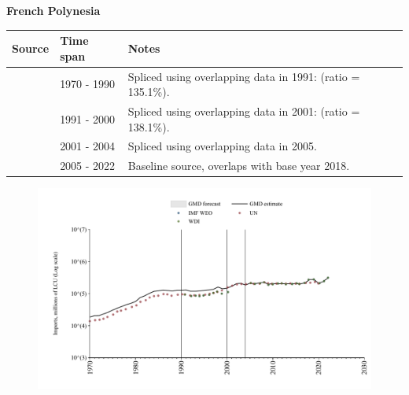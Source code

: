 \documentclass[12pt,a4paper,landscape]{article}
\begin{document}
\begin{adjustbox}{max totalsize={\paperwidth}{\paperheight},center}
\begin{minipage}[t][\textheight][t]{\textwidth}
\vspace*{0.5cm}
{}
\begin{center}
{\Large\bfseries French Polynesia}
\end{center}
\vspace{0.5cm}
\begin{table}[H]
\centering
\small
\begin{tabular}{|l|l|l|}
\hline
\textbf{Source} & \textbf{Time span} & \textbf{Notes} \\
\hline
\rowcolor{white}\cite{UN}& 1970 - 1990 &Spliced using overlapping data in 1991: (ratio = 135.1\%).\\
\rowcolor{lightgray}\cite{WDI}& 1991 - 2000 &Spliced using overlapping data in 2001: (ratio = 138.1\%).\\
\rowcolor{white}\cite{UN}& 2001 - 2004 &Spliced using overlapping data in 2005.\\
\rowcolor{lightgray}\cite{WDI}& 2005 - 2022 &Baseline source, overlaps with base year 2018.\\
\hline
\end{tabular}
\end{table}
\begin{figure}[H]
\centering
\includegraphics[width=\textwidth,height=0.6\textheight,keepaspectratio]{graphs/PYF_imports.pdf}
\end{figure}
\end{minipage}
\end{adjustbox}
\end{document}

